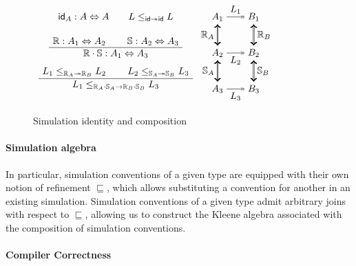\documentclass[sigplan,10pt,review,anonymous]{acmart}
\newcommand{\kw}[1]{\ensuremath{ \mathsf{#1} }}
\begin{document}
\begin{figure} %
  $\begin{array}{c}
    \kw{id}_A : A \Leftrightarrow A
    \qquad
    L \le_{\kw{id} \twoheadrightarrow \kw{id}} L
    \\[1.5em]
    \AxiomC{$\mathbb{R} : A_1 \Leftrightarrow A_2$}
    \AxiomC{$\mathbb{S} : A_2 \Leftrightarrow A_3$}
    \BinaryInfC{$\mathbb{R} \cdot \mathbb{S} : A_1 \Leftrightarrow A_3$}
    \DisplayProof
    \\[1.5em]
    \AxiomC{$L_1 \le_{\mathbb{R}_A \twoheadrightarrow \mathbb{R}_B} L_2$}
    \AxiomC{$L_2 \le_{\mathbb{S}_A \twoheadrightarrow \mathbb{S}_B} L_3$}
    \BinaryInfC{$
      L_1 \le_{\mathbb{R}_A \cdot \mathbb{S}_A \rightarrow
               \mathbb{R}_B \cdot \mathbb{S}_B} L_3$}
    \DisplayProof
  \end{array}
  \begin{tikzpicture}[baseline,scale=0.66]
    \node (A1) at (-1,  2) {$A_1$};
    \node (A2) at (-1,  0) {$A_2$};
    \node (A3) at (-1, -2) {$A_3$};
    \node (B1) at ( 1,  2) {$B_1$};
    \node (B2) at ( 1,  0) {$B_2$};
    \node (B3) at ( 1, -2) {$B_3$};
    \draw (A1) edge[->>] node[auto] {$L_1$} (B1);
    \draw (A2) edge[->>] node[auto,swap] {$L_2$} (B2);
    \draw (A3) edge[->>] node[auto,swap] {$L_3$} (B3);
    \draw (A1) edge[<->, double] node[auto,swap] {$\mathbb{R}_A$} (A2);
    \draw (B1) edge[<->, double] node[auto] {$\mathbb{R}_B$} (B2);
    \draw (A2) edge[<->, double] node[auto,swap] {$\mathbb{S}_A$} (A3);
    \draw (B2) edge[<->, double] node[auto] {$\mathbb{S}_B$} (B3);
  \end{tikzpicture}
  $
  \caption{Simulation identity and composition}
  \label{fig:simcomp}
\end{figure}

\paragraph{Simulation algebra} %

In particular,
simulation conventions of a given type
are equipped with their own notion of refinement $\sqsubseteq$,
which allows substituting
a convention for another in an existing simulation.
Simulation conventions of a given type
admit arbitrary joins with respect to $\sqsubseteq$,
allowing us to construct the Kleene algebra
associated with the composition of simulation conventions.


\paragraph{Compiler Correctness} \label{sec:compcert:overview} %
\end{document}
